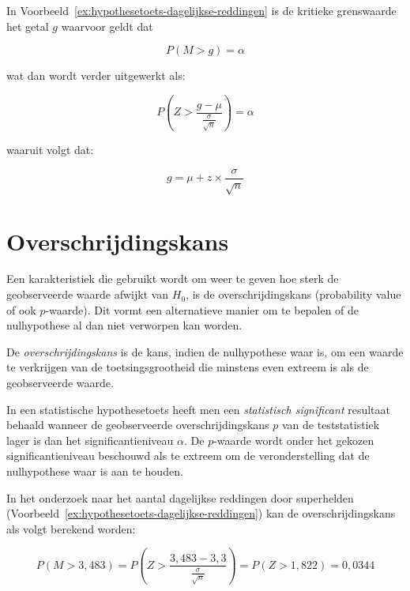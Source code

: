 In Voorbeeld~\ref{ex:hypothesetoets-dagelijkse-reddingen} is de kritieke grenswaarde het getal $g$ waarvoor geldt dat

\[ P(M > g) = \alpha \]

wat dan wordt verder uitgewerkt als:

\[ P(Z > \frac{g - \mu}{\frac{\sigma}{\sqrt{n}}}) = \alpha \]

waaruit volgt dat:

\begin{equation}
  \label{eq:kritieke-waarde-rechtszijdig}
  g = \mu + z \times \frac{\sigma}{\sqrt{n}}
\end{equation}

\section{Overschrijdingskans}
\label{sec:overschrijdingskans}

Een karakteristiek die gebruikt wordt om weer te geven hoe sterk de geobserveerde waarde afwijkt van $H_{0}$, is de overschrijdingskans (probability value of ook $p$-waarde). Dit vormt een alternatieve manier om te bepalen of de nulhypothese al dan niet verworpen kan worden.

\begin{definition}[overschrijdingskans]
  De \emph{overschrijdingskans} is de kans, indien de nulhypothese waar is, om een waarde te verkrijgen van de toetsingsgrootheid die minstens even extreem is als de geobserveerde waarde.
\end{definition}

\begin{definition}
  In een statistische hypothesetoets heeft men een \emph{statistisch significant} resultaat behaald wanneer de geobserveerde overschrijdingskans $p$ van de teststatistiek lager is dan het significantieniveau $\alpha$. De $p$-waarde wordt onder het gekozen significantieniveau beschouwd als te extreem om de veronderstelling dat de nulhypothese waar is aan te houden.
\end{definition}

\begin{example}
  In het onderzoek naar het aantal dagelijkse reddingen door superhelden (Voorbeeld~\ref{ex:hypothesetoets-dagelijkse-reddingen}) kan de overschrijdingskans als volgt berekend worden:
  
\[ P(M > 3,483) = P \left(Z> \frac{3,483 - 3,3}{\frac{\sigma}{\sqrt{n}}}\right) = P (Z > 1,822) = 0,0344 \]
\end{example}

